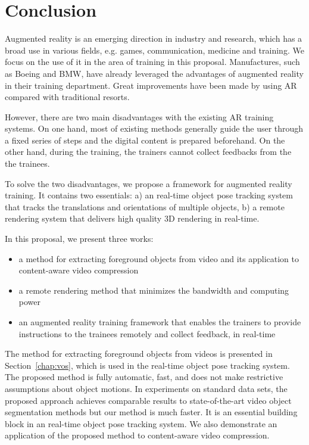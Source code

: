 \chapter{Conclusion}
\label{chap:c}

Augmented reality is an emerging direction in industry and research, which has a broad use in various fields, e.g. games, communication, medicine and training. We focus on the use of it in the area of training in this proposal. Manufactures, such as Boeing and BMW, have already leveraged the advantages of augmented reality in their training department. Great improvements have been made by using AR compared with traditional resorts.

However, there are two main disadvantages with the existing AR training systems. On one hand, most of existing methods generally guide the user through a fixed series of steps and the digital content is prepared beforehand. On the other hand, during the training, the trainers cannot collect feedbacks from the the trainees. 

To solve the two disadvantages, we propose a framework for augmented reality training. It contains two essentials: a) an real-time object pose tracking system that tracks the translations and orientations of multiple objects, b) a remote rendering system that delivers high quality 3D rendering in real-time.

In this proposal, we present three works:

\begin{itemize}
  \item
  a method for extracting foreground objects from video and its application to content-aware video compression
  \item
  a remote rendering method that minimizes the bandwidth and computing power
  \item
  an augmented reality training framework that enables the trainers to provide instructions to the trainees remotely and collect feedback, in real-time
\end{itemize}

The method for extracting foreground objects from videos is presented in Section~\ref{chap:vos}, which is used in the real-time object pose tracking system.
The proposed method is fully automatic, fast, and does not make restrictive assumptions about object motions.
In experiments on standard data sets, the proposed approach achieves comparable results to state-of-the-art video object segmentation methods but our method is much faster.
It is an essential building block in an real-time object pose tracking system.
We also demonstrate an application of the proposed method to content-aware video compression.

